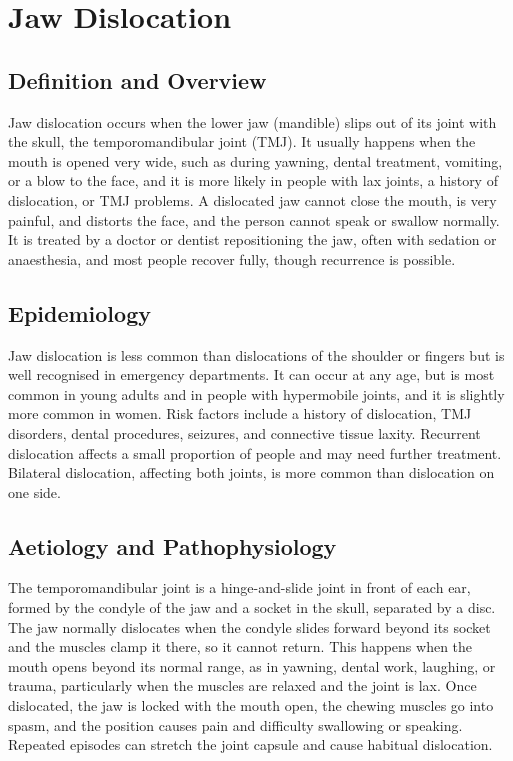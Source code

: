 \chapter{Jaw Dislocation}

\section*{Definition and Overview}
Jaw dislocation occurs when the lower jaw (mandible) slips out of its joint with the skull, the temporomandibular joint (TMJ). It usually happens when the mouth is opened very wide, such as during yawning, dental treatment, vomiting, or a blow to the face, and it is more likely in people with lax joints, a history of dislocation, or TMJ problems. A dislocated jaw cannot close the mouth, is very painful, and distorts the face, and the person cannot speak or swallow normally. It is treated by a doctor or dentist repositioning the jaw, often with sedation or anaesthesia, and most people recover fully, though recurrence is possible.

\section*{Epidemiology}
Jaw dislocation is less common than dislocations of the shoulder or fingers but is well recognised in emergency departments. It can occur at any age, but is most common in young adults and in people with hypermobile joints, and it is slightly more common in women. Risk factors include a history of dislocation, TMJ disorders, dental procedures, seizures, and connective tissue laxity. Recurrent dislocation affects a small proportion of people and may need further treatment. Bilateral dislocation, affecting both joints, is more common than dislocation on one side.

\section*{Aetiology and Pathophysiology}
The temporomandibular joint is a hinge-and-slide joint in front of each ear, formed by the condyle of the jaw and a socket in the skull, separated by a disc. The jaw normally dislocates when the condyle slides forward beyond its socket and the muscles clamp it there, so it cannot return. This happens when the mouth opens beyond its normal range, as in yawning, dental work, laughing, or trauma, particularly when the muscles are relaxed and the joint is lax. Once dislocated, the jaw is locked with the mouth open, the chewing muscles go into spasm, and the position causes pain and difficulty swallowing or speaking. Repeated episodes can stretch the joint capsule and cause habitual dislocation.


